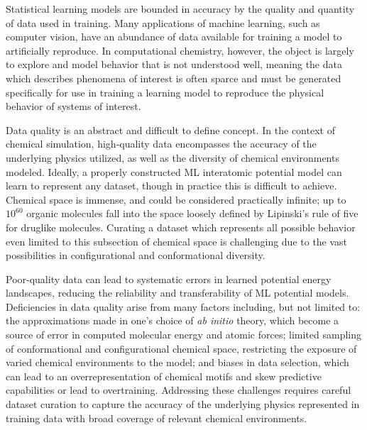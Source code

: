 Statistical learning models are bounded in accuracy by the quality and quantity of data used in training. 
Many applications of machine learning, such as computer vision, have an abundance of data available for training a model to artificially reproduce. \cite{deep_learning_lecun}
In computational chemistry, however, the object is largely to explore and model behavior that is not understood well, meaning the data which describes phenomena of interest is often sparce and must be generated specifically \cite{ml_energy_conserving_ff_chmiela, pes_fitted_by_NN_handley, ab_initio_pes_using_ml_lu, protein_ff_fragmentation_nn_wang, PES_gasphase} for use in training a learning model to reproduce the physical behavior of systems of interest. 

Data quality is an abstract and difficult to define concept.
In the context of chemical simulation, high-quality data encompasses the accuracy of the underlying physics utilized, as well as the diversity of chemical environments modeled.
Ideally, a properly constructed ML interatomic potential model can learn to represent any dataset, though in practice this is difficult to achieve.
Chemical space is immense, and could be considered practically infinite; up to $10^{60}$ organic molecules \cite{chemical_space} fall into the space loosely defined by Lipinski's rule of five \cite{lipinski} for druglike molecules.
Curating a dataset which represents all possible behavior even limited to this subsection of chemical space is challenging due to the vast possibilities in configurational and conformational diversity.

Poor-quality data can lead to systematic errors in learned potential energy landscapes, reducing the reliability and transferability of ML potential models.
Deficiencies in data quality arise from many factors including, but not limited to: the approximations made in one's choice of \textit{ab initio} theory, which become a source of error in computed molecular energy and atomic forces; limited sampling of conformational and configurational chemical space, restricting the exposure of varied chemical environments to the model; and biases in data selection, which can lead to an overrepresentation of chemical motifs and skew predictive capabilities or lead to overtraining.
Addressing these challenges requires careful dataset curation to capture the accuracy of the underlying physics represented in training data with broad coverage of relevant chemical environments.

